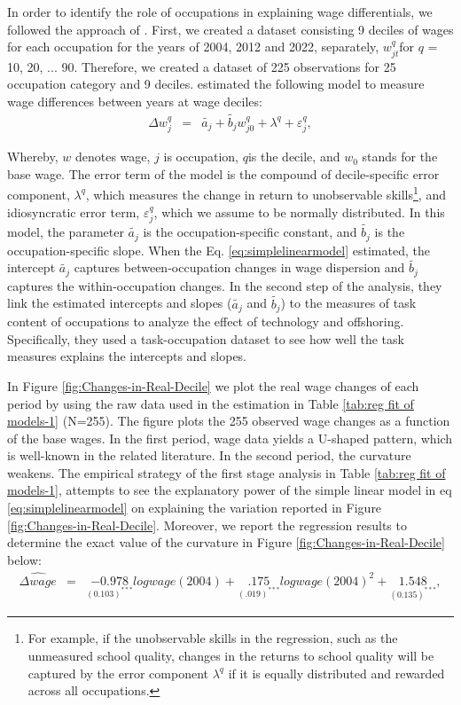\begin{onehalfspace}
In order to identify the role of occupations in explaining wage differentials,
we followed the approach of \citet{2011Firpo,Fortin2016}. First,
we created a dataset consisting 9 deciles of wages for each occupation
for the years of 2004, 2012 and 2022, separately, $w_{jt}^{q}$for
$q$ = 10, 20, ... 90. Therefore, we created a dataset of 225 observations
for 25 occupation category and 9 deciles. \citet{Fortin2011} estimated
the following model to measure wage differences between years at wage
deciles:
\begin{eqnarray}
\Delta w_{j}^{q} & = & \widetilde{a_{j}}+\widetilde{b_{j}}w_{j0}^{q}+\lambda^{q}+\varepsilon_{j}^{q},\label{eq:simplelinearmodel}
\end{eqnarray}

Whereby, $w$ denotes wage, $j$ is occupation, $q$is the decile,
and $w_{0}$ stands for the base wage. The error term of the model
is the compound of decile-specific error component, $\lambda^{q}$,
which measures the change in return to unobservable skills\footnote{For example, if the unobservable skills in the regression, such as
the unmeasured school quality, changes in the returns to school quality
will be captured by the error component $\lambda^{q}$ if it is equally
distributed and rewarded across all occupations.}, and idiosyncratic error term, $\varepsilon_{j}^{q}$, which we assume
to be normally distributed. In this model, the parameter $\tilde{a_{j}}$
is the occupation-specific constant, and $\tilde{b_{j}}$ is the occupation-specific
slope. When the Eq. \ref{eq:simplelinearmodel} estimated, the intercept
$\tilde{a_{j}}$ captures between-occupation changes in wage dispersion
and $\tilde{b_{j}}$ captures the within-occupation changes. In the
second step of the analysis, they link the estimated intercepts and
slopes ($\tilde{a_{j}}$ and $\tilde{b_{j}}$) to the measures of
task content of occupations to analyze the effect of technology and
offshoring. Specifically, they used a task-occupation dataset to see
how well the task measures explains the intercepts and slopes.

In Figure \ref{fig:Changes-in-Real-Decile} we plot the real wage
changes of each period by using the raw data used in the estimation
in Table \ref{tab:reg fit of models-1} (N=255). The figure plots
the 255 observed wage changes as a function of the base wages. In
the first period, wage data yields a U-shaped pattern, which is well-known
in the related literature. In the second period, the curvature weakens.
The empirical strategy of the first stage analysis in Table \ref{tab:reg fit of models-1},
attempts to see the explanatory power of the simple linear model in
eq \ref{eq:simplelinearmodel} on explaining the variation reported
in Figure \ref{fig:Changes-in-Real-Decile}. Moreover, we report the
regression results to determine the exact value of the curvature in
Figure \ref{fig:Changes-in-Real-Decile} below:
\begin{eqnarray}
\widehat{\Delta wage} & = & \underset{(0.103)^{***}}{-0.978}logwage(2004)+\underset{(.019)^{***}}{.175}logwage(2004)^{2}+\underset{(0.135)^{***}}{1.548},\label{eq:quadeq}
\end{eqnarray}


\end{onehalfspace}
